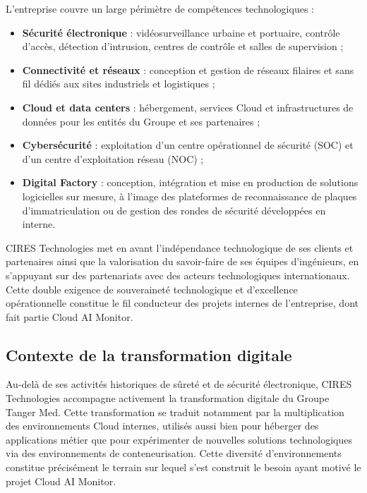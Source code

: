 \documentclass[11pt,a4paper]{report}
\begin{document}
L'entreprise couvre un large périmètre de compétences technologiques :

\begin{itemize}[label=\textbullet, leftmargin=1.5cm, labelsep=0.5cm,
                itemsep=0.3em, parsep=0em, topsep=0.3em]
    \item \textbf{Sécurité électronique} : vidéosurveillance urbaine et
    portuaire, contrôle d'accès, détection d'intrusion, centres de contrôle et
    salles de supervision ;
    \item \textbf{Connectivité et réseaux} : conception et gestion de réseaux
    filaires et sans fil dédiés aux sites industriels et logistiques ;
    \item \textbf{Cloud et data centers} : hébergement, services Cloud et
    infrastructures de données pour les entités du Groupe et ses partenaires ;
    \item \textbf{Cybersécurité} : exploitation d'un centre opérationnel de
    sécurité (SOC) et d'un centre d'exploitation réseau (NOC) ;
    \item \textbf{Digital Factory} : conception, intégration et mise en
    production de solutions logicielles sur mesure, à l'image des plateformes
    de reconnaissance de plaques d'immatriculation ou de gestion des rondes de
    sécurité développées en interne.
\end{itemize}

CIRES Technologies met en avant l'indépendance technologique de ses clients et
partenaires ainsi que la valorisation du savoir-faire de ses équipes
d'ingénieurs, en s'appuyant sur des partenariats avec des acteurs
technologiques internationaux. Cette double exigence de souveraineté
technologique et d'excellence opérationnelle constitue le fil conducteur des
projets internes de l'entreprise, dont fait partie Cloud AI Monitor.

\subsection{Contexte de la transformation digitale}

Au-delà de ses activités historiques de sûreté et de sécurité électronique,
CIRES Technologies accompagne activement la transformation digitale du Groupe
Tanger Med. Cette transformation se traduit notamment par la multiplication
des environnements Cloud internes, utilisés aussi bien pour héberger des
applications métier que pour expérimenter de nouvelles solutions
technologiques via des environnements de conteneurisation. Cette diversité
d'environnements constitue précisément le terrain sur lequel s'est construit
le besoin ayant motivé le projet Cloud AI Monitor.
\end{document}
